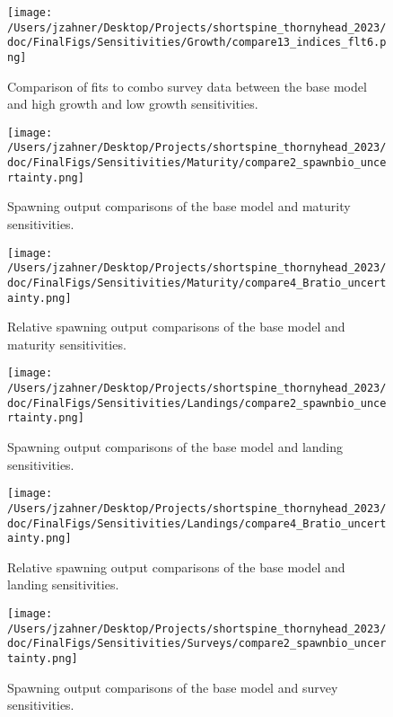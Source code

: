\documentclass[11pt,
  english,
  letterpaper,
]{article}
\begin{document}
\begin{figure}
\centering
\texttt{[image: /Users/jzahner/Desktop/Projects/shortspine\_thornyhead\_2023/doc/FinalFigs/Sensitivities/Growth/compare13\_indices\_flt6.png]}
\caption{Comparison of fits to combo survey data between the base model and high growth and low growth sensitivities.\label{fig:growth_sensitiv_indx}}
\end{figure}

\begin{figure}
\centering
\texttt{[image: /Users/jzahner/Desktop/Projects/shortspine\_thornyhead\_2023/doc/FinalFigs/Sensitivities/Maturity/compare2\_spawnbio\_uncertainty.png]}
\caption{Spawning output comparisons of the base model and maturity sensitivities.\label{fig:mat_sensitiv_spawning}}
\end{figure}

\begin{figure}
\centering
\texttt{[image: /Users/jzahner/Desktop/Projects/shortspine\_thornyhead\_2023/doc/FinalFigs/Sensitivities/Maturity/compare4\_Bratio\_uncertainty.png]}
\caption{Relative spawning output comparisons of the base model and maturity sensitivities.\label{fig:mat_sensitiv_mngmt}}
\end{figure}

\begin{figure}
\centering
\texttt{[image: /Users/jzahner/Desktop/Projects/shortspine\_thornyhead\_2023/doc/FinalFigs/Sensitivities/Landings/compare2\_spawnbio\_uncertainty.png]}
\caption{Spawning output comparisons of the base model and landing sensitivities.\label{fig:land_sensitiv_spawning}}
\end{figure}

\begin{figure}
\centering
\texttt{[image: /Users/jzahner/Desktop/Projects/shortspine\_thornyhead\_2023/doc/FinalFigs/Sensitivities/Landings/compare4\_Bratio\_uncertainty.png]}
\caption{Relative spawning output comparisons of the base model and landing sensitivities.\label{fig:land_sensitiv_mngmt}}
\end{figure}

\begin{figure}
\centering
\texttt{[image: /Users/jzahner/Desktop/Projects/shortspine\_thornyhead\_2023/doc/FinalFigs/Sensitivities/Surveys/compare2\_spawnbio\_uncertainty.png]}
\caption{Spawning output comparisons of the base model and survey sensitivities.\label{fig:surv_sensitiv_spawning}}
\end{figure}
\end{document}
